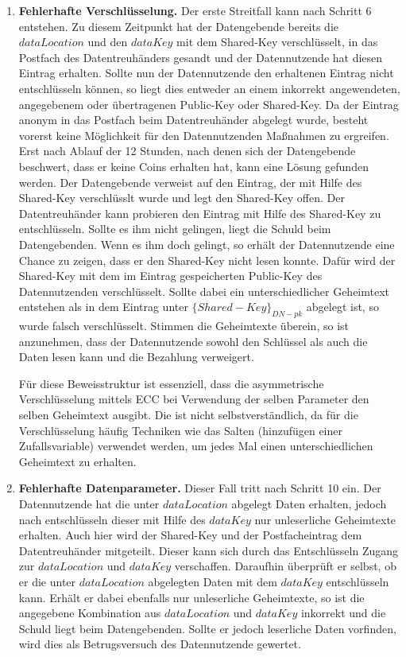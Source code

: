 \documentclass[
	fontsize=12pt,
	headings=small,
	parskip=half,           %
	bibliography=totoc,
	numbers=noenddot,       %
	open=any,               %
]{scrreprt}
\begin{document}
\begin{enumerate}
    \item \textbf{Fehlerhafte Verschlüsselung.}\label{case:IncorrectEncryption}
    Der erste Streitfall kann nach Schritt 6 entstehen. Zu diesem Zeitpunkt hat der Datengebende bereits die $dataLocation$ und den $dataKey$ mit dem Shared-Key verschlüsselt, in das Postfach des Datentreuhänders gesandt und der Datennutzende hat diesen Eintrag erhalten. Sollte nun der Datennutzende den erhaltenen Eintrag nicht entschlüsseln können, so liegt dies entweder an einem inkorrekt angewendeten, angegebenem oder übertragenen Public-Key oder Shared-Key. Da der Eintrag anonym in das Postfach beim Datentreuhänder abgelegt wurde, besteht vorerst keine Möglichkeit für den Datennutzenden Maßnahmen zu ergreifen. Erst nach Ablauf der 12 Stunden, nach denen sich der Datengebende beschwert, dass er keine Coins erhalten hat, kann eine Lösung gefunden werden. Der Datengebende verweist auf den Eintrag, der mit Hilfe des Shared-Key verschlüsslt wurde und legt den Shared-Key offen. Der Datentreuhänder kann probieren den Eintrag mit Hilfe des Shared-Key zu entschlüsseln. Sollte es ihm nicht gelingen, liegt die Schuld beim Datengebenden. Wenn es ihm doch gelingt, so erhält der Datennutzende eine Chance zu zeigen, dass er den Shared-Key nicht lesen konnte. Dafür wird der Shared-Key mit dem im Eintrag gespeicherten Public-Key des Datennutzenden verschlüsselt. Sollte dabei ein unterschiedlicher Geheimtext entstehen als in dem Eintrag unter $\{Shared-Key\}_{DN-pk}$ abgelegt ist, so wurde falsch verschlüsselt. Stimmen die Geheimtexte überein, so ist anzunehmen, dass der Datennutzende sowohl den Schlüssel als auch die Daten lesen kann und die Bezahlung verweigert. 

    Für diese Beweisstruktur ist essenziell, dass die asymmetrische Verschlüsselung mittels ECC bei Verwendung der selben Parameter den selben Geheimtext ausgibt. Die ist nicht selbstverständlich, da für die Verschlüsselung häufig Techniken wie das Salten (hinzufügen einer Zufallsvariable) verwendet werden, um jedes Mal einen unterschiedlichen Geheimtext zu erhalten.
    
    
    \item \textbf{Fehlerhafte Datenparameter.}\label{case:IncorrectDataParameters}
    Dieser Fall tritt nach Schritt 10 ein. Der Datennutzende hat die unter $dataLocation$ abgelegt Daten erhalten, jedoch nach entschlüsseln dieser mit Hilfe des $dataKey$ nur unleserliche Geheimtexte erhalten. Auch hier wird der Shared-Key und der Postfacheintrag dem Datentreuhänder mitgeteilt. Dieser kann sich durch das Entschlüsseln Zugang zur $dataLocation$ und $dataKey$ verschaffen. Daraufhin überprüft er selbst, ob er die unter $dataLocation$ abgelegten Daten mit dem $dataKey$ entschlüsseln kann. Erhält er dabei ebenfalls nur unleserliche Geheimtexte, so ist die angegebene Kombination aus $dataLocation$ und $dataKey$ inkorrekt und die Schuld liegt beim Datengebenden. Sollte er jedoch leserliche Daten vorfinden, wird dies als Betrugsversuch des Datennutzende gewertet.


\end{enumerate}
\end{document}
